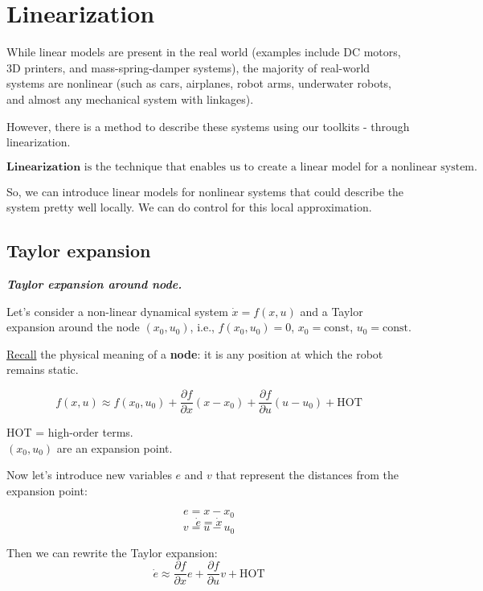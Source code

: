 \section{Linearization}

While linear models are present in the real world (examples include DC motors, 3D printers, and mass-spring-damper systems), the majority of real-world systems are nonlinear (such as cars, airplanes, robot arms, underwater robots, and almost any mechanical system with linkages).

However, there is a method to describe these systems using our toolkits - through linearization.

\begin{equation*}
    \boxed{\textbf{Linearization}} \text{ is the technique that enables us to create a linear model for a nonlinear system.}
\end{equation*}

So, we can introduce linear models for nonlinear systems that could describe the system pretty well locally. We can do control for this local approximation. 

\subsection{Taylor expansion}

\begin{center}
    \textit{\textbf{Taylor expansion around node.}}
\end{center}

Let's consider a non-linear dynamical system $\dot{x} = f(x, u)$ and a Taylor expansion around the node $(x_0, u_0)$, i.e., 
$f(x_0, u_0) = 0$, $x_0 = \text{const}$, $u_0 = \text{const}$. 

\underline{Recall} the physical meaning of a \textbf{node}: it is any position at which the robot remains static. 

\[
    f(x, u) \approx f(x_0, u_0) + \frac{\partial f}{\partial x} (x-x_0) + \frac{\partial f}{\partial u} (u-u_0) + \text{HOT}
\]

HOT = high-order terms. \\

$(x_0, u_0)$ are an expansion point.

Now let's introduce new variables $e$ and $v$ that represent the distances from the expansion point:

\[
e = x - x_0
\]
\[
\dot{e} = \dot{x}
\]
\[
v = u - u_0
\]

Then we can rewrite the Taylor expansion:
\[
    \dot e \approx \frac{\partial f}{\partial x} e + \frac{\partial f}{\partial u} v + \text{HOT}
\]

